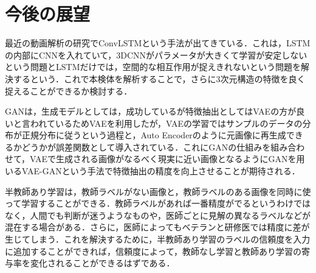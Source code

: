 \section{今後の展望}

最近の動画解析の研究でConvLSTMという手法が出てきている．これは，LSTMの内部にCNNを入れていて，3DCNNがパラメータが大きくて学習が安定しないという問題とLSTMだけでは，空間的な相互作用が捉えきれないという問題を解決するという．これで本検体を解析することで，さらに3次元構造の特徴を良く捉えることができるか検討する．

GANは，生成モデルとしては，成功しているが特徴抽出としてはVAEの方が良いと言われているためVAEを利用したが，VAEの学習ではサンプルのデータの分布が正規分布に従うという過程と，Auto Encoderのように元画像に再生成できるかどうかが誤差関数として導入されている．これにGANの仕組みを組み合わせて，VAEで生成される画像がなるべく現実に近い画像となるようにGANを用いるVAE-GANという手法で特徴抽出の精度を向上させることが期待される．

半教師あり学習は，教師ラベルがない画像と，教師ラベルのある画像を同時に使って学習することができる．教師ラベルがあれば一番精度がでるというわけではなく，人間でも判断が迷うようなものや，医師ごとに見解の異なるラベルなどが混在する場合がある．さらに，医師によってもベテランと研修医では精度に差が生じてしまう．これを解決するために，半教師あり学習のラベルの信頼度を入力に追加することができれば，信頼度によって，教師なし学習と教師あり学習の寄与率を変化されることができるはずである．